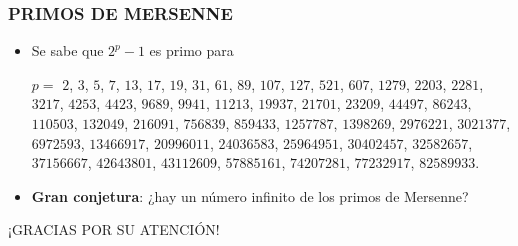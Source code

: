 \begin{frame}
  \frametitle{PRIMOS DE MERSENNE}

  \begin{itemize}
  \item<2-> Se sabe que $2^p - 1$ es primo para

    $p = $ $2$, $3$, $5$, $7$, $13$, $17$, $19$, $31$, $61$, $89$, $107$, $127$,
    $521$, $607$, $1279$, $2203$, $2281$, $3217$, $4253$, $4423$, $9689$,
    $9941$, $11213$, $19937$, $21701$, $23209$, $44497$, $86243$, $110503$,
    $132049$, $216091$, $756839$, $859433$, $1257787$, $1398269$, $2976221$,
    $3021377$, $6972593$, $13466917$, $20996011$, $24036583$, $25964951$,
    $30402457$, $32582657$, $37156667$, $42643801$, $43112609$, $57885161$,
    $74207281$, $77232917$, $82589933$.

  \item<3-> \textbf{Gran conjetura}: ¿hay un número infinito de los primos de
    Mersenne?
  \end{itemize}
\end{frame}

\begin{frame}

  \vfill

  \begin{center}\huge\headingfont
    ¡GRACIAS POR SU ATENCIÓN!
  \end{center}

  \vfill
\end{frame}

